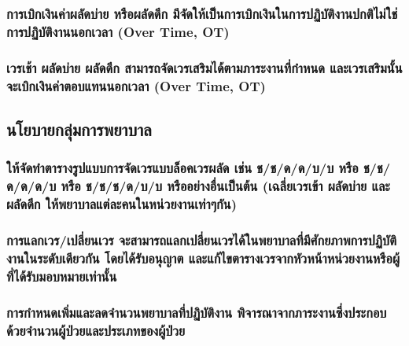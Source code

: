 \hspace{0.5cm}\hangindent=2.6cm\subsubsection{การเบิกเงินค่าผลัดบ่าย หรือผลัดดึก มีจัดให้เป็นการเบิกเงินในการปฏิบัติงานปกติไม่ใช่การปฏิบัติงานนอกเวลา (Over Time, OT)}

\hspace{0.5cm}\hangindent=2.6cm\subsubsection{เวรเช้า ผลัดบ่าย ผลัดดึก สามารถจัดเวรเสริมได้ตามภาระงานที่กำหนด และเวรเสริมนั้นจะเบิกเงินค่าตอบแทนนอกเวลา (Over Time, OT)}

\clearpage

\hspace{0pt}\subsection{นโยบายกลุ่มการพยาบาล}

\hspace{1cm}{เป็นนโยบายในการจัดเวรผลัดของพยาบาลวิชาชีพ พยาบาลเทคนิค ผู้ช่วยพยาบาล สำหรับทุกหน่วยงานให้ถือปฏิบัติ เพื่อความเป็นธรรมแก่พยาบาลและความปลอดภัยของผู้ป่วย ได้แก่}

\hspace{0.5cm}\hangindent=2.6cm\subsubsection{ให้จัดทำตารางรูปแบบการจัดเวรแบบล็อคเวรผลัด เช่น ช/ช/ด/ด/บ/บ หรือ ช/ช/ด/ด/ด/บ หรือ ช/ช/ช/ด/บ/บ หรืออย่างอื่นเป็นต้น (เฉลี่ยเวรเข้า ผลัดบ่าย และผลัดดึก ให้พยาบาลแต่ละคนในหน่วยงานเท่าๆกัน)}

\hspace{0.5cm}\hangindent=2.6cm\subsubsection{การแลกเวร/เปลี่ยนเวร จะสามารถแลกเปลี่ยนเวรได้ในพยาบาลที่มีศักยภาพการปฏิบัติงานในระดับเดียวกัน โดยได้รับอนุญาต และแก้ไขตารางเวรจากหัวหน้าหน่วยงานหรือผู้ที่ได้รับมอบหมายเท่านั้น}

\hspace{0.5cm}\hangindent=2.6cm\subsubsection{การกำหนดเพิ่มและลดจำนวนพยาบาลที่ปฏิบัติงาน พิจารณาจากภาระงานซึ่งประกอบด้วยจำนวนผู้ป่วยและประเภทของผู้ป่วย}

